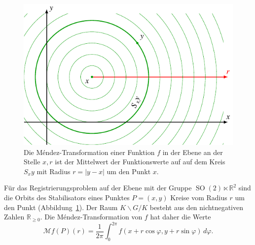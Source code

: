 \begin{beispiel}
\begin{figure}
\centering
\includegraphics{chapters/070-nichtkomm/images/2dmendez.pdf}
\caption{Die Méndez-Transformation einer Funktion $f$ in der
Ebene an der Stelle $x,r$ ist der Mittelwert der Funktionswerte
auf auf dem Kreis $S_xy$ mit Radius $r=|y-x|$ um den Punkt $x$.
\label{buch:nichtkomm:mendez:fig:2d}}
\end{figure}
Für das Registrierungsproblem auf der Ebene mit der Gruppe
$\operatorname{SO}(2)\ltimes \mathbb{R}^2$ sind die Orbits des
Stabilisators eines Punktes $P=(x,y)$ Kreise vom Radius $r$ um
den Punkt (Abbildung~\ref{buch:nichtkomm:mendez:fig:2d}).
Der Raum $K\backslash G/K$ besteht aus den nichtnegativen
Zahlen $\mathbb{R}_{\ge 0}$.
Die Méndez-Transformation von $f$ hat daher die Werte
\[
\mathcal{M}f(P)(r)
=
\frac{1}{2\pi}
\int_0^{2\pi}
f(x+r\cos\varphi,y+r\sin\varphi)\,d\varphi.
\]
\end{beispiel}

